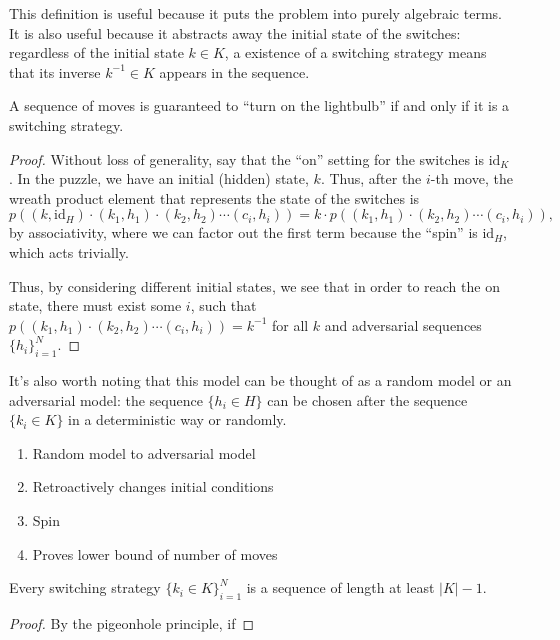 
This definition is useful because it puts the problem into purely algebraic
terms. It is also useful because it abstracts away the initial state of the
switches: regardless of the initial state $k \in K$, a existence of a switching strategy
means that its inverse $k^{-1} \in K$ appears in the sequence.

\begin{lemma}
  A sequence of moves is guaranteed to ``turn on the lightbulb'' if and only if
  it is a switching strategy.
\end{lemma}
\begin{proof}
  Without loss of generality, say that the ``on'' setting for the switches is
  $\mathrm{id}_K$.
  In the puzzle, we have an initial (hidden) state, $k$.
  Thus, after the $i$-th move, the wreath product
  element that represents the state of the switches is \[
    p\left((k, \mathrm{id}_H)\cdot(k_1, h_1)\cdot(k_2, h_2)\cdots(c_i, h_i)\right)
    = k \cdot p\left((k_1, h_1)\cdot(k_2, h_2)\cdots(c_i, h_i)\right),
  \] by associativity, where we can factor out the first term because
  the ``spin'' is $\mathrm{id}_H$, which acts trivially.

  Thus, by considering different initial states, we see that in order
  to reach the on state, there must exist some $i$, such that
  $p\left((k_1, h_1)\cdot(k_2, h_2)\cdots(c_i, h_i)\right) = k^{-1}$ for all
  $k$ and adversarial sequences $\{h_i\}_{i=1}^N$.
\end{proof}

It's also worth noting that this model can be thought of as a random model or an
adversarial model: the sequence $\{h_i \in H\}$ can be chosen after the sequence
$\{k_i \in K\}$ in a deterministic way or randomly.

\begin{enumerate}
  \item Random model to adversarial model
  \item Retroactively changes initial conditions
  \item Spin
  \item Proves lower bound of number of moves
\end{enumerate}

\begin{lemma}
  Every switching strategy $\{k_i \in K\}_{i=1}^{N}$ is a sequence of
  length at least $|K| - 1$.
\end{lemma}
\begin{proof}
  By the pigeonhole principle, if
\end{proof}

